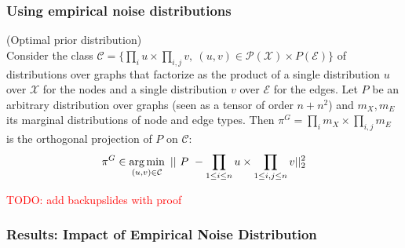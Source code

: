 \documentclass[./presentation.tex]{subfiles}
\begin{document}
\begin{frame}[t,label=digress]
  \frametitle{Using empirical noise distributions}
  \begin{theorem} (Optimal prior distribution) \label{thm:optimal-limit} \\
Consider the class $\mathcal C = \{\prod_i u \times \prod_{i, j} v,~ (u, v) \in \mathcal P(\mathcal{X}) \times P(\mathcal E)\}$ of distributions over graphs that factorize as the product of a single distribution $u$ over $\mathcal X$ for the nodes and a single distribution $v$ over $\mathcal{E}$ for the edges.
Let $P$ be an arbitrary distribution over graphs (seen as a tensor of order $n + n^2$) and $m_X, m_E$ its marginal distributions of node and edge types. Then $\pi^G = \prod_i m_X \times \prod_{i, j} m_E$ is the orthogonal projection of $P$ on $\mathcal{C}$: \vspace{-0.1cm}
\[
\pi^G  \in \operatorname*{arg\,min}_{(u, v) \in \mathcal C}~ ||~P~ -  \prod_{1 \leq i \leq n} u \times \prod_{1 \leq i, j \leq n} v||^2_{2}
\]
\end{theorem}
\textcolor{red}{TODO: add backupslides with proof}
\end{frame}

\begin{frame}[label=digress]
  \frametitle{Results: Impact of Empirical Noise Distribution}
\end{frame}

\begin{frame}[label=digress]
\end{frame}
\end{document}
